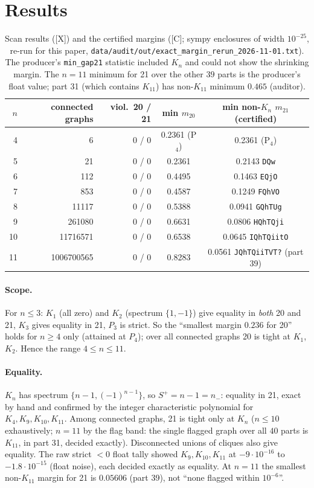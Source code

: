 \documentclass[10pt]{article}
\newcommand{\tier}[1]{\textsf{[#1]}}
\newcommand{\tC}{\tier{C}}
\newcommand{\tX}{\tier{X}}
\newcommand{\tx}[1]{\texttt{#1}}
\begin{document}
\section{Results}\label{sec:results}
\begin{table}[h]\centering\small
\begin{tabular}{@{}rrrcc@{}}\toprule
$n$ & connected graphs & viol.\ 20 / 21 & min $m_{20}$ & min non-$K_n$ $m_{21}$ (certified)\\ \midrule
4 & 6 & 0 / 0 & 0.2361 (P$_4$) & 0.2361 (P$_4$)\\
5 & 21 & 0 / 0 & 0.2361 & 0.2143 \tx{DQw}\\
6 & 112 & 0 / 0 & 0.4495 & 0.1463 \tx{EQjO}\\
7 & 853 & 0 / 0 & 0.4587 & 0.1249 \tx{FQhVO}\\
8 & 11117 & 0 / 0 & 0.5388 & 0.0941 \tx{GQhTUg}\\
9 & 261080 & 0 / 0 & 0.6631 & 0.0806 \tx{HQhTQji}\\
10 & 11716571 & 0 / 0 & 0.6538 & 0.0645 \tx{IQhTQiitO}\\
11 & 1006700565 & 0 / 0 & 0.8283 & 0.0561 \tx{JQhTQiiTVT?} (part 39)\\ \bottomrule
\end{tabular}
\caption{Scan results (\tX{}) and the certified margins (\tC{}; sympy enclosures of width $10^{-25}$, re-run for this paper, \texttt{data/audit/out/exact\_margin\_rerun\_2026-11-01.txt}). The producer's \texttt{min\_gap21} statistic included $K_n$ and could not show the shrinking margin. The $n=11$ minimum for 21 over the other $39$ parts is the producer's float value; part 31 (which contains $K_{11}$) has non-$K_{11}$ minimum $0.465$ (auditor).}\label{tab:res}
\end{table}
\paragraph{Scope.} For $n\le3$: $K_1$ (all zero) and $K_2$ (spectrum $\{1,-1\}$) give equality in \emph{both} 20 and 21, $K_3$ gives equality in 21, $P_3$ is strict. So the ``smallest margin $0.236$ for 20'' holds for $n\ge4$ only (attained at $P_4$); over all connected graphs 20 is tight at $K_1$, $K_2$. Hence the range $4\le n\le11$.
\paragraph{Equality.} $K_n$ has spectrum $\{n-1,(-1)^{n-1}\}$, so $S^+=n-1=n_-$: equality in 21, exact by hand and confirmed by the integer characteristic polynomial for $K_4,K_9,K_{10},K_{11}$. Among connected graphs, 21 is tight only at $K_n$ ($n\le10$ exhaustively; $n=11$ by the flag band: the single flagged graph over all $40$ parts is $K_{11}$, in part 31, decided exactly). Disconnected unions of cliques also give equality. The raw strict $<0$ float tally showed $K_9,K_{10},K_{11}$ at $-9\cdot10^{-16}$ to $-1.8\cdot10^{-15}$ (float noise), each decided exactly as equality. At $n=11$ the smallest non-$K_{11}$ margin for 21 is $0.05606$ (part 39), not ``none flagged within $10^{-6}$''.
\end{document}
